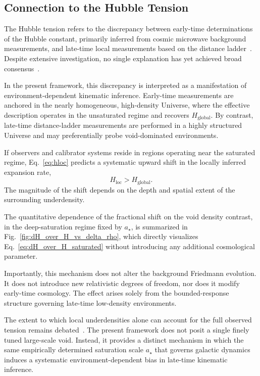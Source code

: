 \subsection{Connection to the Hubble Tension}
  \label{subsec:hubble_tension}

  The Hubble tension refers to the discrepancy between early-time
  determinations of the Hubble constant, primarily inferred from
  cosmic microwave background measurements,
  and late-time local measurements based on the distance ladder~\cite{Riess2022SH0ES,Planck2020}.
  Despite extensive investigation, no single explanation has yet
  achieved broad consensus~\cite{Verde2019Review}.

  In the present framework, this discrepancy is interpreted
  as a manifestation of environment-dependent kinematic inference.
  Early-time measurements are anchored in the nearly homogeneous,
  high-density Universe, where the effective description operates
  in the unsaturated regime and recovers $H_{\mathrm{global}}$.
  By contrast, late-time distance-ladder measurements are performed
  in a highly structured Universe and may preferentially probe
  void-dominated environments.

  If observers and calibrator systems reside in regions operating
  near the saturated regime, Eq.~\eqref{eq:hloc} predicts a systematic
  upward shift in the locally inferred expansion rate,
  \begin{equation}
    H_{\mathrm{loc}} > H_{\mathrm{global}}.
  \end{equation}
  The magnitude of the shift depends on the depth and spatial
  extent of the surrounding underdensity.

  The quantitative dependence of the fractional shift on the void density contrast,
  in the deep-saturation regime fixed by $a_\star$, is summarized in
  Fig.~\ref{fig:dH_over_H_vs_delta_rho}, which directly visualizes
  Eq.~\eqref{eq:dH_over_H_saturated} without introducing any additional
  cosmological parameter.

  Importantly, this mechanism does not alter the background Friedmann evolution.
It does not introduce new relativistic degrees of freedom,
nor does it modify early-time cosmology.
The effect arises solely from the bounded-response structure
governing late-time low-density environments.

The extent to which local underdensities alone can account
for the full observed tension remains debated~\cite{Shanks2019Void,Kennworthy2019VoidCritique}.
The present framework does not posit a single finely tuned large-scale void.
Instead, it provides a distinct mechanism in which the same
empirically determined saturation scale $a_\star$ that governs
galactic dynamics induces a systematic environment-dependent
bias in late-time kinematic inference.

